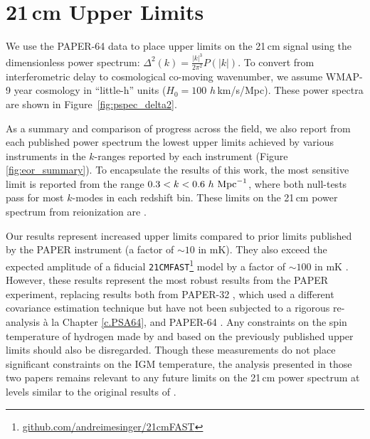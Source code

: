 

\section{21\,cm Upper Limits}
\label{sec:upperlims}

We use the PAPER-64 data to place upper limits on the 21\,cm signal using the
dimensionless power spectrum: $\Delta^{2}(k)= \frac{|k|^{3}}{2\pi^{2}}P(|k|)$. To convert from
interferometric delay to cosmological co-moving wavenumber, we assume WMAP-9 year cosmology in ``little-h'' units ($ H_{0}=100 $ $ h\, $km/s/Mpc). These power spectra are shown in Figure~\ref{fig:pspec_delta2}.

As a summary and comparison of progress across the field, we also report from each published power spectrum the lowest upper limits achieved by various instruments in the $k$-ranges reported by each instrument (Figure \ref{fig:eor_summary}). To encapsulate the results of this work, the most sensitive limit is reported from
the range $0.3 <  k < 0.6\ h\ {\rm Mpc}^{-1}$, where both null-tests
pass for most $k$-modes in each redshift bin.
These limits on the 21\,cm power spectrum
from reionization are \upperlims.

Our results represent increased upper limits compared to prior limits published by the PAPER instrument (a factor of $\sim10$ in mK). They also exceed the expected
amplitude of a fiducial \texttt{21CMFAST}\footnote{\url{github.com/andreimesinger/21cmFAST}}
 model by a factor of $\sim100$ in mK \citep{mesinger_et_al2011}. However, these results represent the
most robust results from the PAPER experiment, replacing results both from PAPER-32 \citep{parsons_et_al2014,jacobs_et_al2015,moore_et_al2017},
which used a different covariance estimation technique
 but have not been subjected to a rigorous re-analysis
\`{a} la Chapter \ref{c.PSA64}, and
PAPER-64 \citep{ali_et_al2015,ali_et_al2018}.
Any constraints on the spin temperature of hydrogen made by
\citet{pober_et_al2015} and \citet{greig_et_al2015a} based on the
previously published upper limits should also be disregarded.
Though these measurements do not place significant constraints on the IGM
temperature, the analysis presented in those two
papers remains relevant to any future limits on the 21\,cm power spectrum 
at levels similar to the original results of .

